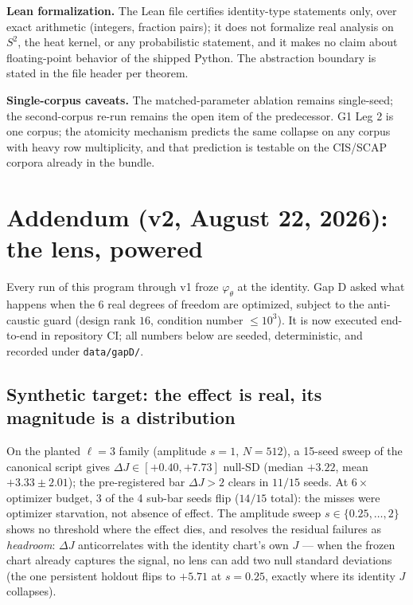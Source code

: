 \documentclass[11pt,a4paper]{article}
\theoremstyle{plain}
\theoremstyle{remark}
\begin{document}
\textbf{Lean formalization.} The Lean file certifies identity-type statements only, over exact arithmetic (integers, fraction pairs); it does not formalize real analysis on $S^2$, the heat kernel, or any probabilistic statement, and it makes no claim about floating-point behavior of the shipped Python. The abstraction boundary is stated in the file header per theorem.

\textbf{Single-corpus caveats.} The matched-parameter ablation remains single-seed; the second-corpus re-run remains the open item of the predecessor. G1 Leg 2 is one corpus; the atomicity mechanism predicts the same collapse on any corpus with heavy row multiplicity, and that prediction is testable on the CIS/SCAP corpora already in the bundle.

\section{Addendum (v2, August 22, 2026): the lens, powered}
\label{sec:gapd-v2}

Every run of this program through v1 froze $\varphi_\theta$ at the identity. Gap D asked what happens when the 6 real degrees of freedom are optimized, subject to the anti-caustic guard (design rank $16$, condition number $\le 10^3$). It is now executed end-to-end in repository CI; all numbers below are seeded, deterministic, and recorded under \texttt{data/gapD/}.

\subsection{Synthetic target: the effect is real, its magnitude is a distribution}
On the planted $\ell{=}3$ family (amplitude $s{=}1$, $N{=}512$), a 15-seed sweep of the canonical script gives $\Delta J \in [+0.40, +7.73]$ null-SD (median $+3.22$, mean $+3.33 \pm 2.01$); the pre-registered bar $\Delta J > 2$ clears in $11/15$ seeds. At $6\times$ optimizer budget, 3 of the 4 sub-bar seeds flip ($14/15$ total): the misses were optimizer starvation, not absence of effect. The amplitude sweep $s \in \{0.25, \dots, 2\}$ shows no threshold where the effect dies, and resolves the residual failures as \emph{headroom}: $\Delta J$ anticorrelates with the identity chart's own $J$ --- when the frozen chart already captures the signal, no lens can add two null standard deviations (the one persistent holdout flips to $+5.71$ at $s{=}0.25$, exactly where its identity $J$ collapses).
\end{document}
